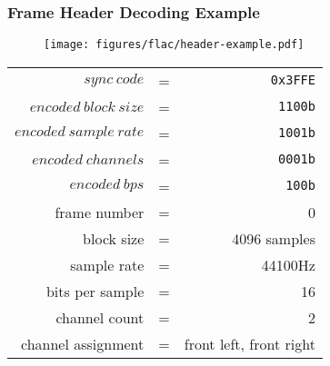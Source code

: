 \subsubsection{Frame Header Decoding Example}
\begin{figure}[h]
\texttt{[image: figures/flac/header-example.pdf]}
\end{figure}
{
\begin{tabular}{rcr}
$sync~code$ & = & \texttt{0x3FFE} \\
$encoded~block~size$ & = & \texttt{1100b} \\
$encoded~sample~rate$ & = & \texttt{1001b} \\
$encoded~channels$ & = & \texttt{0001b} \\
$encoded~bps$ & = & \texttt{100b} \\
frame number & = & 0 \\
block size & = & 4096 samples \\
sample rate & = & 44100Hz \\
bits per sample & = & 16 \\
channel count & = & 2 \\
channel assignment & = & front left, front right
\end{tabular}
}
